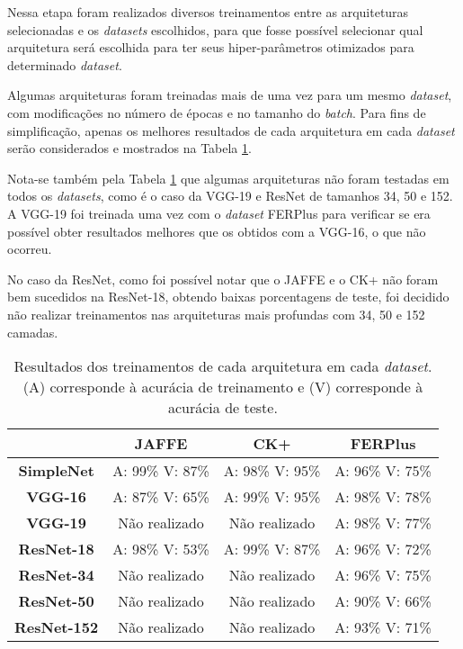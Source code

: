 \documentclass[
12pt,       %
openright,      %
oneside,      %
a4paper,      %
english,      %
french,       %
spanish,      %
brazil        %
]{abntex2}
\begin{document}
Nessa etapa foram realizados diversos treinamentos entre as arquiteturas selecionadas e os \textit{datasets} escolhidos, para que fosse possível selecionar qual arquitetura será escolhida para ter seus hiper-parâmetros otimizados para determinado \textit{dataset}.

Algumas arquiteturas foram treinadas mais de uma vez para um mesmo \textit{dataset}, com modificações no número de épocas e no tamanho do \textit{batch}. Para fins de simplificação, apenas os melhores resultados de cada arquitetura em cada \textit{dataset} serão considerados e mostrados na Tabela \ref{tab:resultados-treinamento}.

Nota-se também pela Tabela \ref{tab:resultados-treinamento} que algumas arquiteturas não foram testadas em todos os \textit{datasets}, como é o caso da VGG-19 e ResNet de tamanhos 34, 50 e 152. A VGG-19 foi treinada uma vez com o \textit{dataset} FERPlus para verificar se era possível obter resultados melhores que os obtidos com a VGG-16, o que não ocorreu.

No caso da ResNet, como foi possível notar que o JAFFE e o CK+ não foram bem sucedidos na ResNet-18, obtendo baixas porcentagens de teste, foi decidido não realizar treinamentos nas arquiteturas mais profundas com 34, 50 e 152 camadas.

\begin{table}[H]
\centering
\caption{Resultados dos treinamentos de cada arquitetura em cada \textit{dataset}. (A) corresponde à acurácia de treinamento e (V) corresponde à acurácia de teste.}
\label{tab:resultados-treinamento}
\begin{tabular}{@{}cccc@{}}
\toprule
                    & \textbf{JAFFE}  & \textbf{CK+}    & \textbf{FERPlus} \\ \midrule
\textbf{SimpleNet}  & A: 99\% V: 87\% & A: 98\% V: 95\% & A: 96\% V: 75\%  \\
\textbf{VGG-16}     & A: 87\% V: 65\% & A: 99\% V: 95\% & A: 98\% V: 78\%  \\
\textbf{VGG-19}     & Não realizado   & Não realizado   & A: 98\% V: 77\%  \\
\textbf{ResNet-18}  & A: 98\% V: 53\% & A: 99\% V: 87\% & A: 96\% V: 72\%  \\
\textbf{ResNet-34}  & Não realizado   & Não realizado   & A: 96\% V: 75\%  \\
\textbf{ResNet-50}  & Não realizado   & Não realizado   & A: 90\% V: 66\%  \\
\textbf{ResNet-152} & Não realizado   & Não realizado   & A: 93\% V: 71\%  \\ \bottomrule
\end{tabular}
\end{table}
\end{document}
